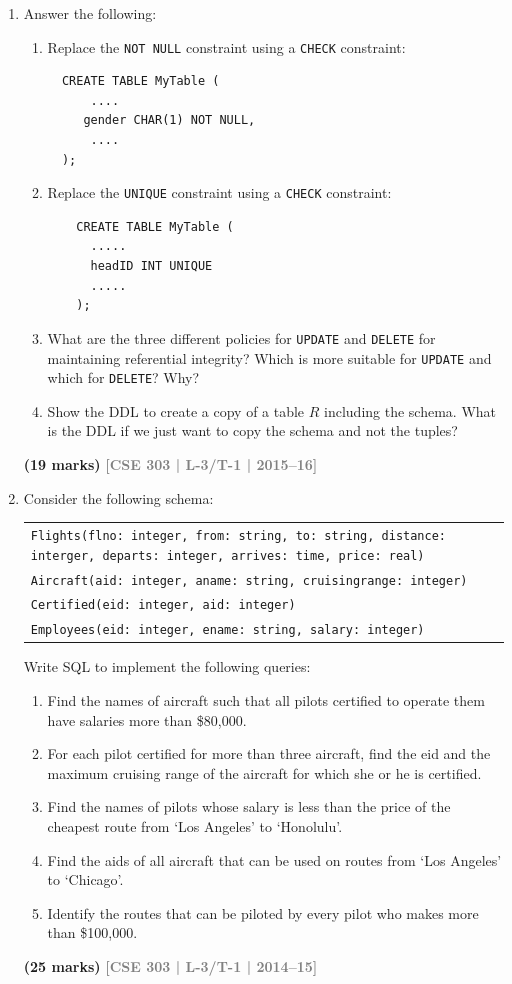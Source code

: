 \documentclass[12pt]{article}
\newcommand{\yr}[1]{\hfill\textcolor{gray}{\small\textbf{[#1]}}}
\newcommand{\mk}[1]{\textcolor{orange!70!black}{\small\textbf{(#1 marks)}}}
\begin{document}
\begin{enumerate}
\item Answer the following:
\begin{enumerate}
  \item Replace the \texttt{NOT NULL} constraint using a \texttt{CHECK} constraint:\\
  \begin{lstlisting}
  CREATE TABLE MyTable (
      ....
     gender CHAR(1) NOT NULL,
      ....
  );
    \end{lstlisting}
  \item Replace the \texttt{UNIQUE} constraint using a \texttt{CHECK} constraint:\\ 
  \begin{lstlisting}
    CREATE TABLE MyTable (
      .....
      headID INT UNIQUE
      .....
    );
  \end{lstlisting} 
  \item What are the three different policies for \texttt{UPDATE} and \texttt{DELETE} for maintaining referential integrity? Which is more suitable for \texttt{UPDATE} and which for \texttt{DELETE}? Why?
  \item Show the DDL to create a copy of a table $R$ including the schema. What is the DDL if we just want to copy the schema and not the tuples?
\end{enumerate}
\mk{19} \yr{CSE 303 | L-3/T-1 | 2015--16}


\item Consider the following schema:
\begin{center}
\begin{tabular}{l}
\texttt{Flights(flno: integer, from: string, to: string, distance: interger, departs: integer, arrives: time, price: real)}\\
\texttt{Aircraft(aid: integer, aname: string, cruisingrange: integer)}\\
\texttt{Certified(eid: integer, aid: integer)}\\
\texttt{Employees(eid: integer, ename: string, salary: integer)}
\end{tabular}
\end{center}
Write SQL to implement the following queries:
\begin{enumerate}
  \item Find the names of aircraft such that all pilots certified to operate them have salaries more than \$80,000.
  \item For each pilot certified for more than three aircraft, find the eid and the maximum cruising range of the aircraft for which she or he is certified.
  \item Find the names of pilots whose salary is less than the price of the cheapest route from `Los Angeles' to `Honolulu'.
  \item Find the aids of all aircraft that can be used on routes from `Los Angeles' to `Chicago'.
  \item Identify the routes that can be piloted by every pilot who makes more than \$100,000.
\end{enumerate}
\mk{25} \yr{CSE 303 | L-3/T-1 | 2014--15}



\end{enumerate}
\end{document}
